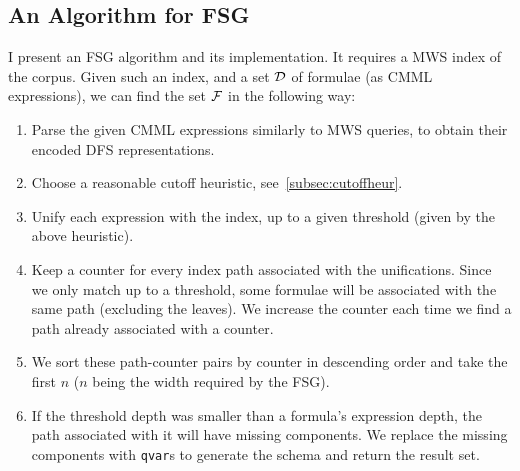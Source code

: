 \documentclass[a4paper,oneside]{article}
\def\MWS{\textsf{MWS}\xspace}
\begin{document}
\subsection{An Algorithm for FSG}\label{subsec:fsgAlgorithm}
I present an FSG algorithm and its implementation. It requires a \MWS index of
the corpus. Given such an index, and a set $\mathcal{D}$ of formulae (as CMML
expressions), we can find the set $\mathcal{F}$ in the following way:
\begin{enumerate}
    \item Parse the given CMML expressions similarly to \MWS queries,
        to obtain their encoded DFS representations.
    \item Choose a reasonable cutoff heuristic, see~\ref{subsec:cutoffheur}.
    \item Unify each expression with the index, up to a given threshold (given
        by the above heuristic).
    \item Keep a counter for every index path associated with the unifications.
        Since we only match up to a threshold, some formulae will be associated
        with the same path (excluding the leaves).
        We increase the counter each time we find a path already associated
        with a counter.
    \item We sort these path-counter pairs by counter in descending order and
        take the first $n$ ($n$ being the width required by the FSG).
    \item If the threshold depth was smaller than a formula's expression
        depth, the path associated with it will have missing components. We
        replace the missing components with \lstinline|qvar|s to generate the
        schema and return the result set.
\end{enumerate}
\end{document}
